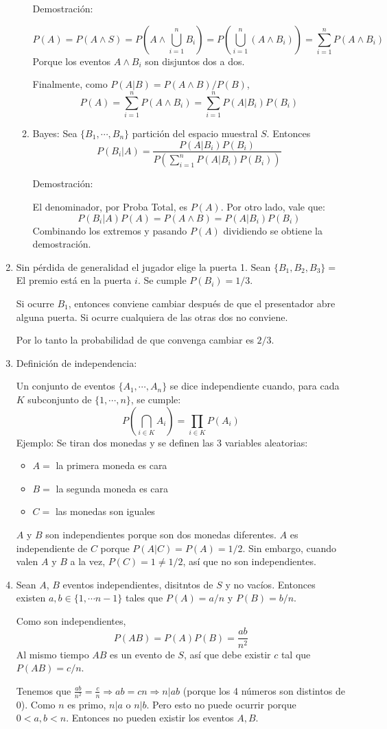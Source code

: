 \begin{enumerate}
\begin{enumerate}
			Demostración:
			
			$$P(A) = P(A \land S) = P\left(A \land \bigcup_{i=1}^{n}B_i\right) = P(\bigcup_{i=1}^{n}(A \land B_i)) = \sum_{i=1}^n P(A\land B_i)$$
			Porque los eventos $A\land B_i$ son disjuntos dos a dos.
			
			Finalmente, como $P(A|B) = P(A\land B)/P(B)$,
			$$P(A) = \sum_{i=1}^n P(A\land B_i) = \sum_{i=1}^n P(A|B_i)P(B_i)$$
		\item Bayes:
			Sea $\{B_1, \cdots, B_n\}$ partición del espacio muestral $S$. Entonces
				$$P(B_i|A) = \frac{P(A|B_i)P(B_i)}{P\left(\sum_{i=1}^{n} P(A|B_i)P(B_i)\right)}$$
				
			Demostración:
			
			El denominador, por Proba Total, es $P(A)$. Por otro lado, vale que:
			$$P(B_i|A)P(A) = P(A\land B) = P(A|B_i)P(B_i)$$
			Combinando los extremos y pasando $P(A)$ dividiendo se obtiene la demostración.
		\end{enumerate}
	\item
		Sin pérdida de generalidad el jugador elige la puerta 1. Sean $\{B_1, B_2, B_3\} = $ El premio está en la puerta $i$. Se cumple $P(B_i) = 1/3$.
		
		Si ocurre $B_1$, entonces conviene cambiar después de que el presentador abre alguna puerta. Si ocurre cualquiera de las otras dos no conviene.
		
		Por lo tanto la probabilidad de que convenga cambiar es $2/3$.
	\item
		Definición de independencia:
			
			Un conjunto de eventos $\{A_1, \cdots, A_n\}$ se dice independiente cuando, para cada $K$ subconjunto de $\{1, \cdots, n\}$, se cumple:
			$$P\left(\bigcap_{i\in K}{A_i}\right) = \prod_{i\in K}P(A_i)$$
		Ejemplo: Se tiran dos monedas y se definen las 3 variables aleatorias:
		\begin{itemize}
			\item $A = $ la primera moneda es cara
			\item $B = $ la segunda moneda es cara
			\item $C = $ las monedas son iguales
		\end{itemize}
		$A$ y $B$ son independientes porque son dos monedas diferentes. $A$ es independiente de $C$ porque $P(A|C) = P(A) = 1/2$. Sin embargo, cuando valen $A$ y $B$ a la vez, $P(C) = 1 \neq 1/2$, así que no son independientes.
	\item
		Sean $A$, $B$ eventos independientes, disitntos de $S$ y no vacíos. Entonces existen $a,b \in \{1, \cdots n-1\}$ tales que $P(A) = a/n$ y $P(B) = b/n$.
		
		Como son independientes, $$P(AB) = P(A)P(B) = \frac{ab}{n^2}$$
		Al mismo tiempo $AB$ es un evento de $S$, así que debe existir $c$ tal que $P(AB) = c/n$.
		
		Tenemos que $\frac{ab}{n^2} = \frac{c}{n}\Rightarrow ab=cn \Rightarrow n|ab$ (porque los 4 números son distintos de $0$).
		Como $n$ es primo, $n|a$ o $n|b$. Pero esto no puede ocurrir porque $0<a,b<n$. Entonces no pueden existir los eventos $A,B$. 
\end{enumerate}
